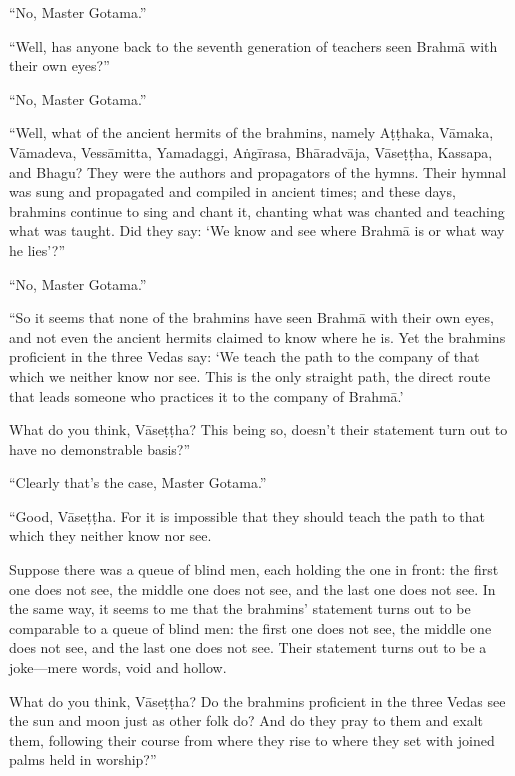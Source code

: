 \documentclass[12pt,openany]{book}%
\begin{document}
“No, Master Gotama.” 

“Well, has anyone back to the seventh generation of teachers seen \textsanskrit{Brahmā} with their own eyes?” 

“No, Master Gotama.” 

“Well, what of the ancient hermits of the brahmins, namely \textsanskrit{Aṭṭhaka}, \textsanskrit{Vāmaka}, \textsanskrit{Vāmadeva}, \textsanskrit{Vessāmitta}, Yamadaggi, \textsanskrit{Aṅgīrasa}, \textsanskrit{Bhāradvāja}, \textsanskrit{Vāseṭṭha}, Kassapa, and Bhagu? They were the authors and propagators of the hymns. Their hymnal was sung and propagated and compiled in ancient times; and these days, brahmins continue to sing and chant it, chanting what was chanted and teaching what was taught. Did they say: ‘We know and see where \textsanskrit{Brahmā} is or what way he lies’?” 

“No, Master Gotama.” 

“So it seems that none of the brahmins have seen \textsanskrit{Brahmā} with their own eyes, and not even the ancient hermits claimed to know where he is. Yet the brahmins proficient in the three Vedas say: ‘We teach the path to the company of that which we neither know nor see. This is the only straight path, the direct route that leads someone who practices it to the company of \textsanskrit{Brahmā}.’ 

What do you think, \textsanskrit{Vāseṭṭha}? This being so, doesn’t their statement turn out to have no demonstrable basis?” 

“Clearly that’s the case, Master Gotama.” 

“Good, \textsanskrit{Vāseṭṭha}. For it is impossible that they should teach the path to that which they neither know nor see. 

Suppose there was a queue of blind men, each holding the one in front: the first one does not see, the middle one does not see, and the last one does not see. In the same way, it seems to me that the brahmins’ statement turns out to be comparable to a queue of blind men: the first one does not see, the middle one does not see, and the last one does not see. Their statement turns out to be a joke—mere words, void and hollow. 

What do you think, \textsanskrit{Vāseṭṭha}? Do the brahmins proficient in the three Vedas see the sun and moon just as other folk do? And do they pray to them and exalt them, following their course from where they rise to where they set with joined palms held in worship?” 
\end{document}
